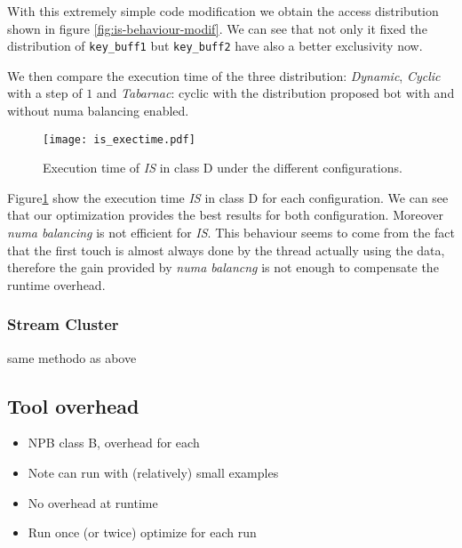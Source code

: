 With this extremely simple code modification we obtain the access distribution
shown in figure \ref{fig:is-behaviour-modif}. We can see that not only it fixed
the distribution of \texttt{key\_buff1} but \texttt{key\_buff2} have also a
better exclusivity now.

We then compare the execution time of the three distribution: \emph{Dynamic},
\emph{Cyclic} with a step of $1$ and \emph{Tabarnac}: cyclic with the
distribution proposed bot with and without numa balancing enabled.


\begin{figure}[htpb]
    \centering
    \texttt{[image: is\_exectime.pdf]}
    \caption{Execution time of \emph{IS} in class D under the different
configurations.}
\label{fig:is-res}
\end{figure}

Figure\ref{fig:is-res} show the execution time \emph{IS} in class D for each
configuration. We can see that our optimization provides the best results for
both configuration.  Moreover \emph{numa balancing} is not efficient for
\emph{IS}. This behaviour seems to come from the fact that the first touch is
almost always done by the thread actually using the data, therefore the gain
provided by \emph{numa balancng} is not enough to compensate the runtime
overhead.

\subsubsection{Stream Cluster}
same methodo as above

\subsection{Tool overhead}
\label{sec:expe-overhead}
\begin{itemize}
    \item NPB class B, overhead for each
    \item Note can run with (relatively) small  examples
    \item No overhead at runtime
    \item Run once (or twice) optimize for each run
\end{itemize}
